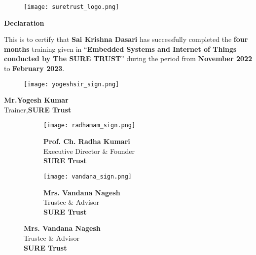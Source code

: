 \documentclass[12pt]{article}
\begin{document}
\pagebreak

\begin{figure}[h]
\centering
\texttt{[image: suretrust\_logo.png]}
\end{figure}

\begin{center}
{\LARGE \textbf{ Declaration\\}}
\end{center}
{\large  \hspace{0.6in}     This is to certify that \textbf{Sai Krishna Dasari} has successfully    completed the\textbf{ four months} training given in “\textbf{Embedded Systems and Internet of Things conducted by The SURE TRUST}” during the period from \textbf{November 2022} to\textbf{ February 2023}}.\\

{\begin{center}
\begin{figure}[h]
\centering
\texttt{[image: yogeshsir\_sign.png]}
\end{figure}
\textbf{Mr.Yogesh Kumar}\\
Trainer,\textbf{SURE Trust}
\end{center}}

\begin{figure}
  \begin{subfigure}[b]{0.4\linewidth}
    \texttt{[image: radhamam\_sign.png]}
    \caption*{\textbf{Prof. Ch. Radha Kumari}\\
 Executive Director \& Founder\\
 \textbf{SURE Trust}}
    \label{fig:image1}
  \end{subfigure}
  \hspace{0.2\linewidth}
  \begin{subfigure}[b]{0.4\linewidth}
    \texttt{[image: vandana\_sign.png]}
    \caption*{\textbf{Mrs. Vandana Nagesh}\\
Trustee \& Advisor\\
 \textbf{SURE Trust}}
    \label{fig:image2}
  \end{subfigure}
  \label{fig:two_images}
\end{figure}
\end{document}
